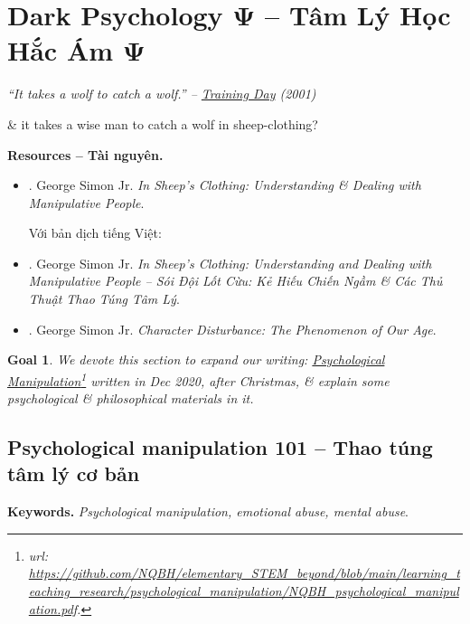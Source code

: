 \documentclass[12pt]{article}
\newtheorem{goal}{Goal}
\begin{document}

\section{Dark Psychology $\boldsymbol{\Psi}$ -- Tâm Lý Học Hắc Ám $\boldsymbol{\Psi}$}

\begin{flushright}\it
	``It takes a wolf to catch a wolf.'' -- \href{https://www.imdb.com/title/tt0139654/}{Training Day} (2001)
\end{flushright}
\& it takes a wise man to catch a wolf in sheep-clothing?

\noindent\textbf{\textsf{Resources -- Tài nguyên.}}
\begin{itemize}
	\item \cite{Simon_sheep}. {\sc George Simon Jr.} {\it In Sheep's Clothing: Understanding \& Dealing with Manipulative People}.
	
	Với bản dịch tiếng Việt:
	\item \cite{Simon_sheep_VN}. {\sc George Simon Jr.} {\it In Sheep's Clothing: Understanding and Dealing with Manipulative People -- Sói Đội Lốt Cừu: Kẻ Hiếu Chiến Ngầm \& Các Thủ Thuật Thao Túng Tâm Lý}.
	
	\item \cite{Simon_character}. {\sc George Simon Jr.} {\it Character Disturbance: The Phenomenon of Our Age}.
\end{itemize}

\begin{goal}
	We devote this section to expand our writing: \href{https://github.com/NQBH/elementary_STEM_beyond/blob/main/learning_teaching_research/psychological_manipulation/NQBH_psychological_manipulation.pdf}{Psychological Manipulation}\footnote{{\sc url}: \url{https://github.com/NQBH/elementary_STEM_beyond/blob/main/learning_teaching_research/psychological_manipulation/NQBH_psychological_manipulation.pdf}.} written in Dec 2020, after Christmas, \& explain some psychological \& philosophical materials in it.
\end{goal}

\subsection{Psychological manipulation 101 -- Thao túng tâm lý cơ bản}
\label{sect: psychological manipulation}
{\bf Keywords.} {\it Psychological manipulation, emotional abuse, mental abuse}.
\end{document}
